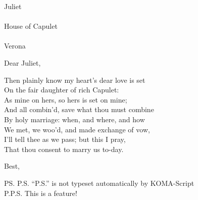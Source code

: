 \documentclass{scrlttr2}
\date{July  3, 1580.}
\begin{document}

\begin{letter}{%
Juliet \\\\
House of Capulet \\\\
Verona \\}

\opening{Dear Juliet,}


Then plainly know my heart's dear love is set \\
On the fair daughter of rich Capulet: \\
As mine on hers, so hers is set on mine; \\
And all combin'd, save what thou must combine \\
By holy marriage: when, and where, and how \\
We met, we woo'd, and made exchange of vow, \\
I'll tell thee as we pass; but this I pray, \\
That thou consent to marry us to-day. \\

\closing{Best,}

\ps{P.S. ``P.S.'' is not typeset automatically by KOMA-Script \\


\noindent P.P.S. This is a feature! \\}
\end{letter}

\end{document}

